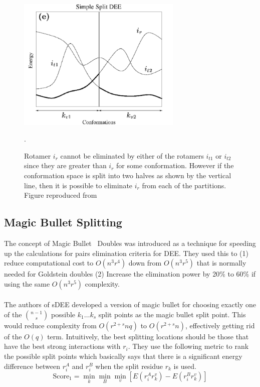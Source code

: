 \documentclass{article}
\begin{document}
\begin{figure}[h!]
    \centering
    \includegraphics[width=0.7\textwidth]{pics/split1.pdf}
    \caption{Rotamer $i_r$ cannot be eliminated by either of the rotamers $i_{t1}$ or $i_{t2}$ since they are greater than $i_r$ for some conformation. However if the conformation space is split into two halves as shown by the vertical line, then it is possible to eliminate $i_r$ from each of the partitions. Figure reproduced from~\cite{Pierce2000}}.
    \label{fig:splitDEE}
\end{figure}
\pagebreak

\subsection{Magic Bullet Splitting}
The concept of Magic Bullet~\cite{Gordon1998} Doubles was introduced as a technique for speeding up the calculations for pairs elimination criteria for DEE. They used this to (1) reduce computational cost to $O(n^3r^4)$ down from $O(n^3r^5)$ that is normally needed for Goldstein doubles (2) Increase the elimination power by 20\% to 60\% if using the same $O(n^3r^5)$ complexity. 
\\
\\
The authors of sDEE developed a version of magic bullet for choosing exactly one of the $n-1 \choose s$ possible $k_1\dots k_s$ split points as the magic bullet split point. This would reduce complexity from $O(r^{2+s}nq)$ to $O(r^{2+s}n)$, effectively getting rid of the $O(q)$ term. Intuitively, the best splitting locations should be those that have the best strong interactions with $r_i$. They use the following metric to rank the possible split points which basically says that there is a significant energy difference between $r_i^A$ and $r_i^B$ when the split residue $r_k$ is used. 
\[
\text{Score}_1 = \min_k \min_B \min_v[E(r_i^Ar_k^v) - E(r_i^Br_k^v)]
\]
\end{document}
